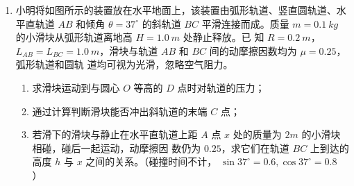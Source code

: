 \begin{enumerate}


\newpage
\item
小明将如图所示的装置放在水平地面上，该装置由弧形轨道、竖直圆轨道、水平直轨道 $ AB $ 和倾角
$ \theta=37 ^{ \circ } $ 的斜轨道 $ BC $ 平滑连接而成。质量 $ m=0.1 \ kg $ 的小滑块从弧形轨道离地高 $ H=1.0 \ m $ 处静止释放。已
知 $ R=0.2 \ m $， $ L_{AB}=L_{BC}=1.0 \ m $，滑块与轨道 $ AB $ 和 $ BC $ 间的动摩擦因数均为 $ \mu=0.25 $，弧形轨道和圆轨
道均可视为光滑，忽略空气阻力。
\begin{enumerate}
\item
求滑块运动到与圆心 $ O $ 等高的 $ D $ 点时对轨道的压力；



\item 
通过计算判断滑块能否冲出斜轨道的末端 $ C $ 点；



\item 
若滑下的滑块与静止在水平直轨道上距 $ A $ 点 $ x $ 处的质量为 $ 2m $ 的小滑块相碰，碰后一起运动，动摩擦因
数仍为 $ 0.25 $，求它们在轨道 $ BC $ 上到达的高度 $ h $ 与 $ x $ 之间的关系。（碰撞时间不计， $ \sin 37 ^{ \circ } =0.6 ,\cos 37 ^{ \circ } =0.8 $ ）
\end{enumerate}
\begin{figure}[h!]
\flushright

\end{figure}



\end{enumerate}
